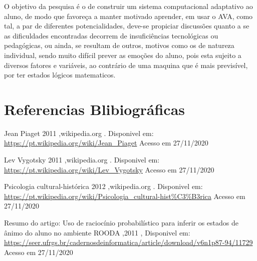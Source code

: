 \documentclass[12pt,a4paper,twocolumn]{article}
\begin{document}
O objetivo da pesquisa é o de construir um sistema computacional adaptativo ao aluno, de modo que favoreça a manter motivado aprender, em usar o AVA,
como tal, a par de diferentes potencialidades, deve-se propiciar discussões quanto a se as dificuldades encontradas decorrem de insuficiências tecnológicas ou pedagógicas, ou ainda, se resultam de  outros, motivos  como os de natureza individual, sendo muito difícil prever as emoções do aluno, pois esta sujeito a diversos fatores e variáveis, ao contrário de uma maquina que é mais previsível, por ter estados lógicos matematicos.


\section{Referencias Blibiográficas}

Jean Piaget 2011 ,wikipedia.org  . Disponivel em: 
\url{https://pt.wikipedia.org/wiki/Jean_Piaget} Acesso em 27/11/2020


Lev Vygotsky 2011 ,wikipedia.org  . Disponivel em: 
\url{https://pt.wikipedia.org/wiki/Lev_Vygotsky} Acesso em 27/11/2020


Psicologia cultural-histórica 2012 ,wikipedia.org  . Disponivel em: 
\url{https://pt.wikipedia.org/wiki/Psicologia_cultural-hist%C3%B3rica} Acesso em 27/11/2020

Resumo do artigo: Uso de raciocínio probabilístico para inferir os  estados de ânimo do aluno no ambiente ROODA ,2011 , Disponivel em: 
\url{https://seer.ufrgs.br/cadernosdeinformatica/article/download/v6n1p87-94/11729} Acesso em 27/11/2020

\end{document}
